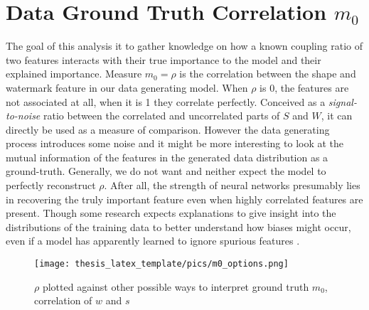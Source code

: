 \section{Data Ground Truth Correlation $m_0$}
The goal of this analysis it to gather knowledge on how a known coupling ratio of two features interacts with their true importance to the model and their explained importance. 
Measure $m_0 = \rho$ is the correlation between the shape and watermark feature in our data generating model. When $\rho$ is 0, the features are not associated at all, when it is 1 they correlate perfectly. Conceived as a \textit{signal-to-noise} ratio between the correlated and uncorrelated parts of $S$ and $W$, it can directly be used as a measure of comparison. However the data generating process introduces some noise and it might be more interesting to look at the mutual information of the features in the generated data distribution as a ground-truth. 
Generally, we do not want and neither expect the model to perfectly reconstruct $\rho$. After all, the strength of neural networks presumably lies in recovering the truly important feature even when highly correlated features are present. Though some research expects explanations to give insight into the distributions of the training data to better understand how biases might occur, even if a model has apparently learned to ignore spurious features \cite{Kindermans2017}. 

\begin{figure}
    \centering
    \texttt{[image: thesis\_latex\_template/pics/m0\_options.png]}
    \caption[Choosing measure for $m_0$]{$\rho$ plotted against other possible ways to interpret ground truth $m_0$, correlation of $w$ and $s$}
    \label{fig:finding_rho}
\end{figure}

